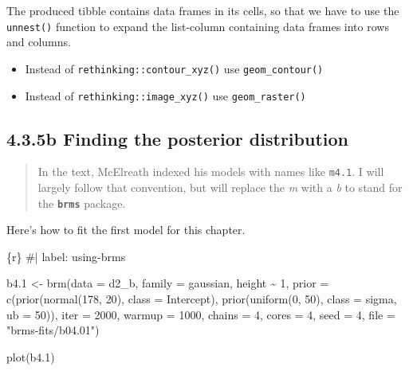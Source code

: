 \documentclass[
  letterpaper,
  DIV=11,
  numbers=noendperiod]{scrreprt}
\newenvironment{Shaded}{\begin{snugshade}}{\end{snugshade}}
\newcommand{\AttributeTok}[1]{\textcolor[rgb]{0.40,0.45,0.13}{#1}}
\newcommand{\CommentTok}[1]{\textcolor[rgb]{0.37,0.37,0.37}{#1}}
\newcommand{\DecValTok}[1]{\textcolor[rgb]{0.68,0.00,0.00}{#1}}
\newcommand{\FloatTok}[1]{\textcolor[rgb]{0.68,0.00,0.00}{#1}}
\newcommand{\FunctionTok}[1]{\textcolor[rgb]{0.28,0.35,0.67}{#1}}
\newcommand{\InformationTok}[1]{\textcolor[rgb]{0.37,0.37,0.37}{#1}}
\newcommand{\NormalTok}[1]{\textcolor[rgb]{0.00,0.23,0.31}{#1}}
\newcommand{\OtherTok}[1]{\textcolor[rgb]{0.00,0.23,0.31}{#1}}
\newcommand{\SpecialCharTok}[1]{\textcolor[rgb]{0.37,0.37,0.37}{#1}}
\newcommand{\StringTok}[1]{\textcolor[rgb]{0.13,0.47,0.30}{#1}}
\providecommand{\tightlist}{%
  \setlength{\itemsep}{0pt}\setlength{\parskip}{0pt}}\usepackage{longtable,booktabs,array}
\begin{document}
The produced tibble contains data frames in its cells, so that we have
to use the \texttt{unnest()} function to expand the list-column
containing data frames into rows and columns.

\begin{itemize}
\tightlist
\item
  Instead of \texttt{rethinking::contour\_xyz()} use
  \texttt{geom\_contour()}
\item
  Instead of \texttt{rethinking::image\_xyz()} use
  \texttt{geom\_raster()}
\end{itemize}

\hypertarget{b-finding-the-posterior-distribution}{%
\subsection{4.3.5b Finding the posterior
distribution}\label{b-finding-the-posterior-distribution}}

\begin{quote}
In the text, McElreath indexed his models with names like \texttt{m4.1}.
I will largely follow that convention, but will replace the \emph{m}
with a \emph{b} to stand for the \textbf{\texttt{brms}} package.
\end{quote}

Here's how to fit the first model for this chapter.

\begin{Shaded}
\begin{Highlighting}[]
\InformationTok{\textasciigrave{}\textasciigrave{}\textasciigrave{}\{r\}}
\CommentTok{\#| label: using{-}brms}

\NormalTok{b4}\FloatTok{.1} \OtherTok{\textless{}{-}} 
  \FunctionTok{brm}\NormalTok{(}\AttributeTok{data =}\NormalTok{ d2\_b, }
      \AttributeTok{family =}\NormalTok{ gaussian,}
\NormalTok{      height }\SpecialCharTok{\textasciitilde{}} \DecValTok{1}\NormalTok{,}
      \AttributeTok{prior =} \FunctionTok{c}\NormalTok{(}\FunctionTok{prior}\NormalTok{(}\FunctionTok{normal}\NormalTok{(}\DecValTok{178}\NormalTok{, }\DecValTok{20}\NormalTok{), }\AttributeTok{class =}\NormalTok{ Intercept),}
                \FunctionTok{prior}\NormalTok{(}\FunctionTok{uniform}\NormalTok{(}\DecValTok{0}\NormalTok{, }\DecValTok{50}\NormalTok{), }\AttributeTok{class =}\NormalTok{ sigma, }\AttributeTok{ub =} \DecValTok{50}\NormalTok{)),}
      \AttributeTok{iter =} \DecValTok{2000}\NormalTok{, }\AttributeTok{warmup =} \DecValTok{1000}\NormalTok{, }\AttributeTok{chains =} \DecValTok{4}\NormalTok{, }\AttributeTok{cores =} \DecValTok{4}\NormalTok{,}
      \AttributeTok{seed =} \DecValTok{4}\NormalTok{,}
      \AttributeTok{file =} \StringTok{"brms{-}fits/b04.01"}\NormalTok{)}

\FunctionTok{plot}\NormalTok{(b4}\FloatTok{.1}\NormalTok{)}
\InformationTok{\textasciigrave{}\textasciigrave{}\textasciigrave{}}
\end{Highlighting}
\end{Shaded}
\end{document}
